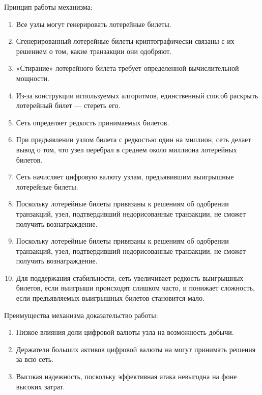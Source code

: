 Принцип работы механизма:

\begin{enumerate} 
    \item Все узлы могут генерировать лотерейные билеты.
    
    \item Сгенерированный лотерейные билеты криптографически связаны с их решением о том, какие транзакции они одобряют.
    
    \item «Стирание» лотерейного билета требует определенной вычислительной мощности.
    
    \item Из-за конструкции используемых алгоритмов, единственный способ раскрыть лотерейный билет — стереть его.
    
    \item Сеть определяет редкость принимаемых билетов.
    
    \item При предъявлении узлом билета с редкостью один на миллион, сеть делает вывод о том, что узел перебрал в среднем около миллиона лотерейных билетов.
    
    \item Сеть начисляет цифровую валюту узлам, предъявившим выигрышные лотерейные билеты.
    
    \item Поскольку лотерейные билеты привязаны к решениям об одобрении транзакций, узел, подтвердивший недорисованные транзакции, не сможет получить вознаграждение.
    
    \item Поскольку лотерейные билеты привязаны к решениям об одобрении транзакций, узел, подтвердивший недорисованные транзакции, не сможет получить вознаграждение.
    
    \item Для поддержания стабильности, сеть увеличивает редкость выигрышных билетов, если выигрыши происходят слишком часто, и понижает сложность, если предъявляемых выигрышных билетов становится мало.
\end{enumerate}

Преимущества механизма доказательство работы:

\begin{enumerate} 
  \item Низкое влияния доли цифровой валюты узла на возможность добычи.
  
  \item Держатели больших активов цифровой валюты на могут принимать решения за всю сеть.
  
  \item Высокая надежность, поскольку эффективная атака невыгодна на фоне высоких затрат.
\end{enumerate}

